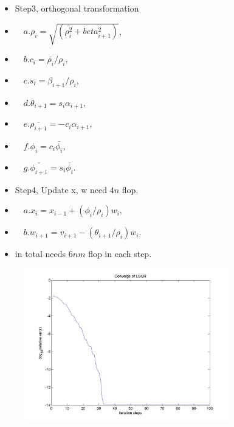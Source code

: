 \documentclass{beamer}
\begin{document}
\begin{frame}
\begin{itemize}
    \item Step3, orthogonal transformation
    \item       $\quad a.\rho_{i}=\sqrt{(\bar{\rho_{i}^2}+beta_{i+1}^2)}$,
    \item       $\quad b.c_{i}=\bar{\rho_{i}}/\rho_{i},$
    \item       $\quad c.s_{i}=\beta_{i+1}/\rho_{i},$
    \item       $\quad d.\theta_{i+1}=s_{i}\alpha_{i+1},$
    \item       $\quad e.\bar{\rho_{i+1}}=-c_{i}\alpha_{i+1},$
    \item       $\quad f.\phi_{i}=c_{i}\bar{\phi_{i}},$
    \item       $\quad g.\bar{\phi_{i+1}}=s_{i}\bar{\phi_{i}}.$
    \item Step4, Update x, w need $4n$ flop.
    \item       $\quad a.x_{i}=x_{i-1}+(\phi_{i}/\rho_{i})w_{i},$
    \item       $\quad b.w_{i+1}=v_{i+1}-(\theta_{i+1}/\rho_{i})w_{i}.$
    \item in total needs $6nm$ flop in each step.
\end{itemize}
\end{frame}

\begin{frame}
    \begin{figure}[htbp]
        \begin{minipage}[b]{0.8\linewidth}
            \includegraphics[width=3.5in]{Images/LSQR}
        \end{minipage}
    \end{figure}
\end{frame}


\end{document}
